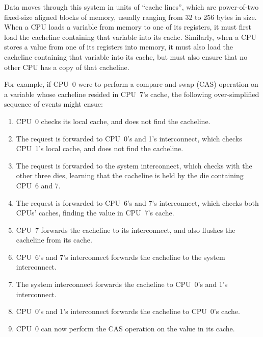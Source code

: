 Data moves through this system in units of ``cache lines'', which
are power-of-two fixed-size aligned blocks of memory, usually ranging
from 32 to 256 bytes in size.
When a CPU loads a variable from memory to one of its registers, it must
first load the cacheline containing that variable into its cache.
Similarly, when a CPU stores a value from one of its registers into
memory, it must also load the cacheline containing that variable into
its cache, but must also ensure that no other CPU has a copy of that
cacheline.

For example, if CPU~0 were to perform a compare-and-swap (CAS) operation on a
variable whose cacheline resided in CPU~7's cache, the following
over-simplified sequence of events might ensue:

\begin{enumerate}
\item	CPU~0 checks its local cache, and does not find the cacheline.
\item	The request is forwarded to CPU~0's and 1's interconnect,
	which checks CPU~1's local cache, and does not find the cacheline.
\item	The request is forwarded to the system interconnect, which
	checks with the other three dies, learning that the cacheline
	is held by the die containing CPU~6 and 7.
\item	The request is forwarded to CPU~6's and 7's interconnect, which
	checks both CPUs' caches, finding the value in CPU~7's cache.
\item	CPU~7 forwards the cacheline to its interconnect, and also
	flushes the cacheline from its cache.
\item	CPU~6's and 7's interconnect forwards the cacheline to the
	system interconnect.
\item	The system interconnect forwards the cacheline to CPU~0's and 1's
	interconnect.
\item	CPU~0's and 1's interconnect forwards the cacheline to CPU~0's
	cache.
\item	CPU~0 can now perform the CAS operation on the value in its cache.
\end{enumerate}

